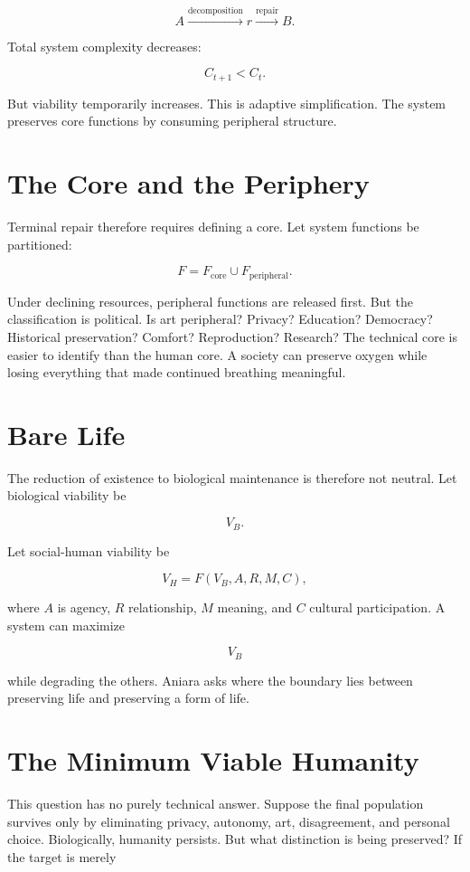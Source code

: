 \documentclass[11pt,oneside]{book}
\theoremstyle{definition}
\theoremstyle{remark}
\begin{document}
\[
A \xrightarrow{\text{decomposition}} r \xrightarrow{\text{repair}} B.
\]

Total system complexity decreases:

\[
C_{t+1}<C_t.
\]

But viability temporarily increases. This is adaptive simplification. The system preserves core
functions by consuming peripheral structure.

\section{The Core and the Periphery}

Terminal repair therefore requires defining a core. Let system functions be partitioned:

\[
F = F_{\mathrm{core}} \cup F_{\mathrm{peripheral}}.
\]

Under declining resources, peripheral functions are released first. But the classification is
political. Is art peripheral? Privacy? Education? Democracy? Historical preservation? Comfort?
Reproduction? Research? The technical core is easier to identify than the human core. A society can
preserve oxygen while losing everything that made continued breathing meaningful.

\section{Bare Life}

The reduction of existence to biological maintenance is therefore not neutral. Let biological
viability be

\[
V_B.
\]

Let social-human viability be

\[
V_H = F(V_B,A,R,M,C),
\]

where \(A\) is agency, \(R\) relationship, \(M\) meaning, and \(C\) cultural participation. A system
can maximize

\[
V_B
\]

while degrading the others. Aniara asks where the boundary lies between preserving life and
preserving a form of life.

\section{The Minimum Viable Humanity}

This question has no purely technical answer. Suppose the final population survives only by
eliminating privacy, autonomy, art, disagreement, and personal choice. Biologically, humanity
persists. But what distinction is being preserved? If the target is merely
\end{document}
